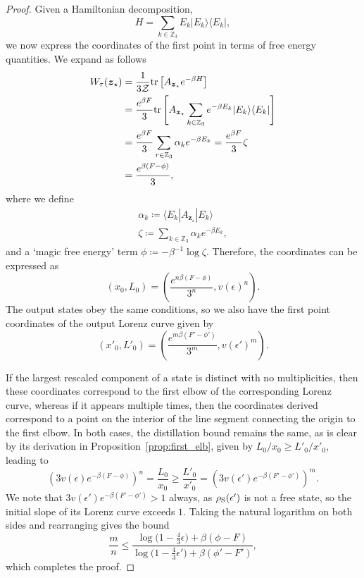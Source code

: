 \documentclass[
twocolumn,
superscriptaddress
]{revtex4-1}
\def\>{\rangle}
\def\<{\langle}
\renewcommand{\tr}{{\rm{tr}}}
\def\z{\boldsymbol{z}}
\def\Z{{\cal Z}}
\begin{document}
\begin{proof}
Given a Hamiltonian decomposition,
\begin{equation}
	H = \sum_{k \in \mathbb{Z}_3} E_k |E_k\>\<E_k|,
\end{equation}
we now express the coordinates of the first point in terms of free energy quantities. We expand as follows
\begin{align}
	W_{\tau}(\z_\star) &= \frac{1}{3\Z}\tr\left[ A_{\z_\star}e^{-\beta H} \right] \nonumber\\
	&= \frac{e^{\beta F}}{3} \tr\left[ A_{\z_\star}\sum_{k \in \mathbb{Z}_3} e^{-\beta E_k} |E_k\>\<E_k| \right] \nonumber\\
	&= \frac{e^{\beta F}}{3} \sum_{r \in \mathbb{Z}_3} \alpha_k e^{-\beta E_k}
	= \frac{e^{\beta F}}{3} \zeta \nonumber\\
	&= \frac{e^{\beta (F - \phi)}}{3},
\end{align}
where we define
\begin{align}
\alpha_k \coloneqq \<E_k |A_{\z_\star} |E_k\> \\
\zeta \coloneqq  \sum_{k \in \mathbb{Z}_3} \alpha_k e^{-\beta E_k},
\end{align}
and a `magic free energy' term $\phi \coloneqq -\beta^{-1} \log \zeta$.
Therefore, the coordinates can be expressed as
\begin{equation}
	(x_0, L_0) = \left( \frac{e^{n\beta (F - \phi)}}{3^n}, v(\epsilon)^n \right).
\end{equation}
The output states obey the same conditions, so we also have the first point coordinates of the output Lorenz curve given by
\begin{equation}
	(x'_0, L'_0) = \left( \frac{e^{m\beta (F' - \phi')}}{3^m}, v(\epsilon')^m \right).
\end{equation}

If the largest rescaled component of a state is distinct with no multiplicities, then these coordinates correspond to the first elbow of the corresponding Lorenz curve, whereas if it appears multiple times, then the coordinates derived correspond to a point on the interior of the line segment connecting the origin to the first elbow.
In both cases, the distillation bound remains the same, as is clear by its derivation in Proposition~\ref{prop:first_elb}, given by $L_0/x_0 \geq L'_0/x'_0$, leading to
\begin{equation}
	\left( 3v(\epsilon)e^{-\beta (F - \phi)} \right)^{n} = \frac{L_0}{x_0}
	\geq \frac{L'_0}{x'_0} = \left( 3v(\epsilon')e^{-\beta (F' - \phi')} \right)^{m}.
\end{equation}
We note that $3v(\epsilon')e^{-\beta (F' - \phi')} > 1$ always, as $\rho_{\rm{S}}(\epsilon')$ is not a free state, so the initial slope of its Lorenz curve exceeds $1$.
Taking the natural logarithm on both sides and rearranging gives the bound
\begin{equation}
	\frac{m}{n} \leq \dfrac{\log \big( 1-\frac{4}{3}\epsilon \big) + \beta (\phi - F)}{\log \big( 1-\frac{4}{3}\epsilon' \big) + \beta (\phi' - F')},
\end{equation}
which completes the proof.
\end{proof}
\end{document}
